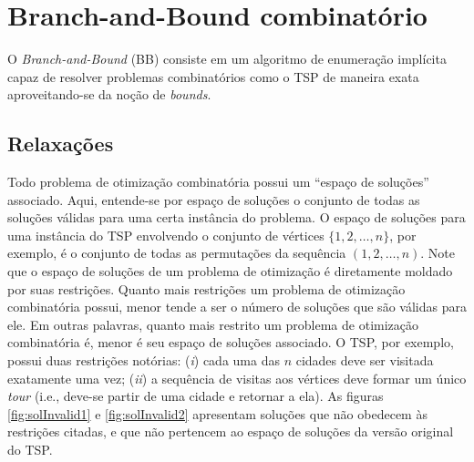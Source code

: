 \chapter{Branch-and-Bound combinatório}
\thispagestyle{empty}

O \textit{Branch-and-Bound} (BB) consiste em um algoritmo de enumeração implícita capaz de resolver problemas combinatórios como o TSP de maneira exata aproveitando-se da noção de \textit{bounds}.


{

\section{Relaxações}
Todo problema de otimização combinatória possui um ``espaço de soluções'' associado. Aqui, entende-se por espaço de soluções o conjunto de todas as soluções válidas para uma certa instância do problema. O espaço de soluções para uma instância do TSP envolvendo o conjunto de vértices $\{1,2,\dots,n\}$, por exemplo, é o conjunto de todas as permutações da sequência \((1,2,\dots,n)\). Note que o espaço de soluções de um problema de otimização é diretamente moldado por suas restrições. Quanto mais restrições um problema de otimização combinatória possui, menor tende a ser o número de soluções que são válidas para ele. Em outras palavras, quanto mais restrito um problema de otimização combinatória é, menor é seu espaço de soluções associado. O TSP, por exemplo, possui duas restrições notórias: (\textit{i}) cada uma das $n$ cidades deve ser visitada exatamente uma vez; (\textit{ii}) a sequência de visitas aos vértices deve formar um único \textit{tour} (i.e., deve-se partir de uma cidade e retornar a ela). As figuras \ref{fig:solInvalid1} e \ref{fig:solInvalid2} apresentam soluções que não obedecem às restrições citadas, e que não pertencem ao espaço de soluções da versão original do TSP.
        
% 

}
